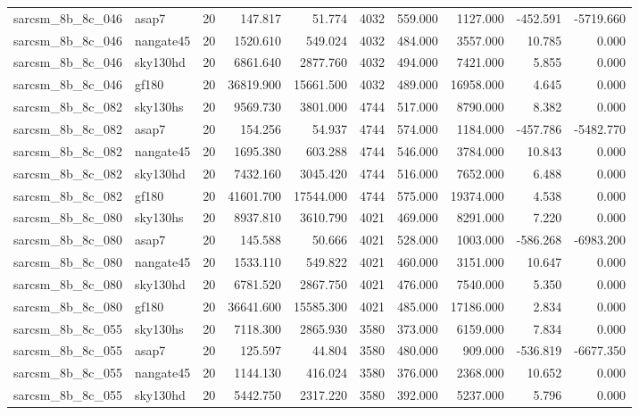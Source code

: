 \documentclass{article}
\begin{document}
\begin{longtable}{llrrrrrrrr}
sarcsm\_8b\_8c\_046 & asap7 & 20 & 147.817 & 51.774 & 4032 & 559.000 & 1127.000 & -452.591 & -5719.660 \\
sarcsm\_8b\_8c\_046 & nangate45 & 20 & 1520.610 & 549.024 & 4032 & 484.000 & 3557.000 & 10.785 & 0.000 \\
sarcsm\_8b\_8c\_046 & sky130hd & 20 & 6861.640 & 2877.760 & 4032 & 494.000 & 7421.000 & 5.855 & 0.000 \\
sarcsm\_8b\_8c\_046 & gf180 & 20 & 36819.900 & 15661.500 & 4032 & 489.000 & 16958.000 & 4.645 & 0.000 \\
sarcsm\_8b\_8c\_082 & sky130hs & 20 & 9569.730 & 3801.000 & 4744 & 517.000 & 8790.000 & 8.382 & 0.000 \\
sarcsm\_8b\_8c\_082 & asap7 & 20 & 154.256 & 54.937 & 4744 & 574.000 & 1184.000 & -457.786 & -5482.770 \\
sarcsm\_8b\_8c\_082 & nangate45 & 20 & 1695.380 & 603.288 & 4744 & 546.000 & 3784.000 & 10.843 & 0.000 \\
sarcsm\_8b\_8c\_082 & sky130hd & 20 & 7432.160 & 3045.420 & 4744 & 516.000 & 7652.000 & 6.488 & 0.000 \\
sarcsm\_8b\_8c\_082 & gf180 & 20 & 41601.700 & 17544.000 & 4744 & 575.000 & 19374.000 & 4.538 & 0.000 \\
sarcsm\_8b\_8c\_080 & sky130hs & 20 & 8937.810 & 3610.790 & 4021 & 469.000 & 8291.000 & 7.220 & 0.000 \\
sarcsm\_8b\_8c\_080 & asap7 & 20 & 145.588 & 50.666 & 4021 & 528.000 & 1003.000 & -586.268 & -6983.200 \\
sarcsm\_8b\_8c\_080 & nangate45 & 20 & 1533.110 & 549.822 & 4021 & 460.000 & 3151.000 & 10.647 & 0.000 \\
sarcsm\_8b\_8c\_080 & sky130hd & 20 & 6781.520 & 2867.750 & 4021 & 476.000 & 7540.000 & 5.350 & 0.000 \\
sarcsm\_8b\_8c\_080 & gf180 & 20 & 36641.600 & 15585.300 & 4021 & 485.000 & 17186.000 & 2.834 & 0.000 \\
sarcsm\_8b\_8c\_055 & sky130hs & 20 & 7118.300 & 2865.930 & 3580 & 373.000 & 6159.000 & 7.834 & 0.000 \\
sarcsm\_8b\_8c\_055 & asap7 & 20 & 125.597 & 44.804 & 3580 & 480.000 & 909.000 & -536.819 & -6677.350 \\
sarcsm\_8b\_8c\_055 & nangate45 & 20 & 1144.130 & 416.024 & 3580 & 376.000 & 2368.000 & 10.652 & 0.000 \\
sarcsm\_8b\_8c\_055 & sky130hd & 20 & 5442.750 & 2317.220 & 3580 & 392.000 & 5237.000 & 5.796 & 0.000 \\

\end{longtable}
\end{document}
